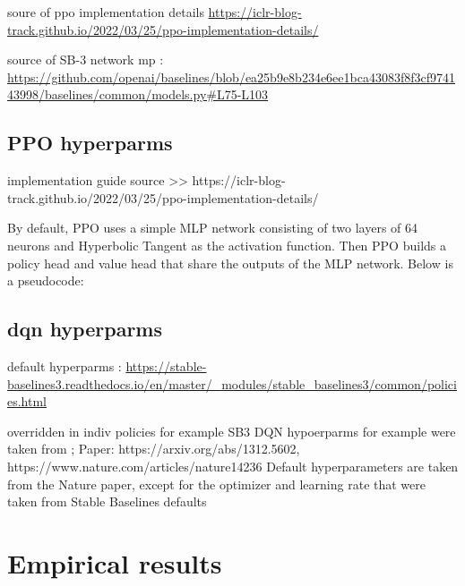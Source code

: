 \documentclass[a4paper, 12pt]{article}
\begin{document}
soure of ppo implementation details \url{https://iclr-blog-track.github.io/2022/03/25/ppo-implementation-details/}

source of SB-3 network mp : \url{https://github.com/openai/baselines/blob/ea25b9e8b234e6ee1bca43083f8f3cf974143998/baselines/common/models.py#L75-L103}

\subsection{PPO hyperparms}

implementation guide source >> https://iclr-blog-track.github.io/2022/03/25/ppo-implementation-details/

By default, PPO uses a simple MLP network consisting of two layers of 64 neurons and Hyperbolic Tangent as the activation function. Then PPO builds a policy head and value head that share the outputs of the MLP network. Below is a pseudocode:

\subsection{dqn hyperparms}


default hyperparms : \url{https://stable-baselines3.readthedocs.io/en/master/_modules/stable_baselines3/common/policies.html}

overridden in indiv policies for example 
SB3 DQN hypoerparms for example were taken from ;
Paper: https://arxiv.org/abs/1312.5602, https://www.nature.com/articles/nature14236
Default hyperparameters are taken from the Nature paper,
except for the optimizer and learning rate that were taken from Stable Baselines defaults




\section{Empirical results}
\end{document}
